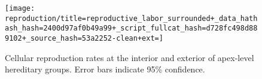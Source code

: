 \begin{figure}[!htbp]
\begin{center}

\texttt{[image: reproduction/title=reproductive\_labor\_surrounded+\_data\_hathash\_hash=2400d97af0b49a99+\_script\_fullcat\_hash=d728fc498d889102+\_source\_hash=53a2252-clean+ext=]}

\caption{
Cellular reproduction rates at the interior and exterior of apex-level hereditary groups.
Error bars indicate 95\% confidence.
}
\label{fig:reproduction_surrounded}
\end{center}
\end{figure}
